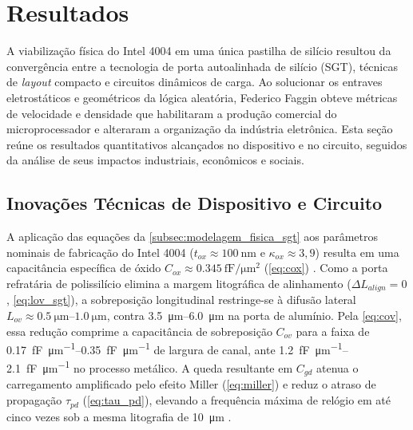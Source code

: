 
\section{Resultados}
\label{sec:resultados}

A viabilização física do Intel 4004 em uma única pastilha de silício resultou da convergência entre a tecnologia de porta autoalinhada de silício (SGT), técnicas de \textit{layout} compacto e circuitos dinâmicos de carga. Ao solucionar os entraves eletrostáticos e geométricos da lógica aleatória, Federico Faggin obteve métricas de velocidade e densidade que habilitaram a produção comercial do microprocessador e alteraram a organização da indústria eletrônica. Esta seção reúne os resultados quantitativos alcançados no dispositivo e no circuito, seguidos da análise de seus impactos industriais, econômicos e sociais.

\subsection{Inovações Técnicas de Dispositivo e Circuito}
\label{subsec:contribuicoes_tecnicas}

A aplicação das equações da \cref{subsec:modelagem_fisica_sgt} aos parâmetros nominais de fabricação do Intel 4004 ($t_{ox} \approx \SI{100}{\nano\meter}$ e $\kappa_{ox} \approx 3{,}9$) resulta em uma capacitância específica de óxido $C_{ox} \approx \SI{0,345}{\femto\farad\per\micro\meter\squared}$ (\cref{eq:cox}) \cite{faggin1970, sze2006}. Como a porta refratária de polissilício elimina a margem litográfica de alinhamento ($\Delta L_{align} = 0$, \cref{eq:lov_sgt}), a sobreposição longitudinal restringe-se à difusão lateral $L_{ov} \approx \SIrange{0,5}{1,0}{\micro\meter}$, contra \SIrange{3,5}{6,0}{\micro\meter} na porta de alumínio. Pela \cref{eq:cov}, essa redução comprime a capacitância de sobreposição $C_{ov}$ para a faixa de \SIrange{0,17}{0,35}{\femto\farad\per\micro\meter} de largura de canal, ante \SIrange{1,2}{2,1}{\femto\farad\per\micro\meter} no processo metálico. A queda resultante em $C_{gd}$ atenua o carregamento amplificado pelo efeito Miller (\cref{eq:miller}) e reduz o atraso de propagação $\tau_{pd}$ (\cref{eq:tau_pd}), elevando a frequência máxima de relógio em até cinco vezes sob a mesma litografia de \SI{10}{\micro\meter} \cite{faggin1970, faggin1996}.

